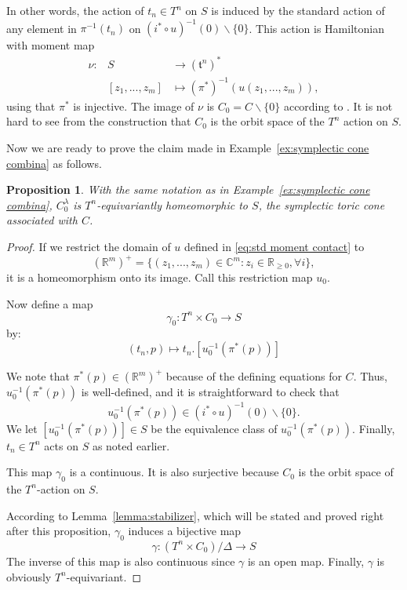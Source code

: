 \documentclass[12pt]{amsart}
\def\R {{\mathbb{R}}}
\def\C {{\mathbb{C}}}
\newtheorem{proposition}[theorem]{Proposition}
\theoremstyle{definition}
\numberwithin{equation}{section}
\begin{document}
In other words, the action of $t_{n}\in T^n$ on $S$ is induced by
the standard action of any element in $\pi^{-1}(t_{n})$ on
$(i^{*}\circ u)^{-1}(0)\backslash \{0\}$. This action is Hamiltonian
with moment map
\begin{eqnarray}\label{eq:moment toric }
\nu: & S& \rightarrow  (\mathfrak{t}^n)^{*}\\
&[z_{1},...,z_{m}]& \mapsto (\pi^{*})^{-1}(u(z_{1},...,z_{m})),
\end{eqnarray}
using that $\pi^{*}$ is injective. The image of $\nu$ is
$C_{0}=C\backslash\{0\}$ according to \cite{L:contact toric}. It is
not hard to see from the construction that $C_{0}$ is the orbit
space of the $T^n$ action on $S$.

Now we are ready to prove the claim made in
Example~\ref{ex:symplectic cone combina} as follows.
\begin{proposition}
With the same notation as in Example~\ref{ex:symplectic cone
combina}, $C_{0}^{\lambda}$ is $T^n$-equivariantly homeomorphic to
$S$, the symplectic toric cone associated with $C$.
\end{proposition}
\begin{proof}

If we restrict the domain of $u$ defined in \eqref{eq:std moment
contact} to
\begin{equation}(\R^m)^{+}=\{(z_{1},...,z_{m})\in \C^m: z_{i}\in \R_{\geq
0},\forall i\},\end{equation} it is a homeomorphism onto its image.
Call this restriction map $u_{0}$.

 Now define a map \begin{equation}\gamma_{0}: T^n\times C_{0}\rightarrow
 S\end{equation} by:
 \[(t_{n},p)\mapsto t_{n}.[u_{0}^{-1}(\pi^{*}(p))]\]

We note that $\pi^{*}(p)\in (\R^m)^{+}$ because of the defining
equations for $C$. Thus, $u_{0}^{-1}(\pi^{*}(p))$ is well-defined,
and it is straightforward to check that
\begin{equation*}u_{0}^{-1}(\pi^{*}(p))\in (i^{*}\circ u)^{-1}(0)\backslash
\{0\}.\end{equation*} We let $[u_{0}^{-1}(\pi^{*}(p))]\in S$ be the
equivalence class of $u_{0}^{-1}(\pi^{*}(p))$. Finally, $t_{n}\in
T^n$ acts on $S$ as noted earlier.


 This map $\gamma_{0}$ is a continuous. It is also surjective because $C_{0}$ is the orbit space of the $T^n$-action on
 $S$.

 According to Lemma~\ref{lemma:stabilizer}, which will be stated and proved right after this proposition, $\gamma_{0}$ induces a bijective map
 \begin{equation}\label{eq:gamma}
 \gamma: (T^n\times C_{0})/\Delta\rightarrow
 S\end{equation}
 The inverse of this map is also continuous since $\gamma$ is an
 open map. Finally, $\gamma$ is obviously $T^n$-equivariant.
\end{proof}
\end{document}
